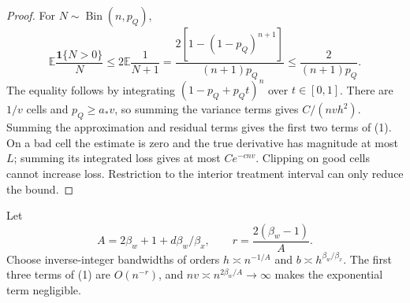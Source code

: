 \documentclass[11pt]{article}
\theoremstyle{remark}\newtheorem{remark}[theorem]{Remark}
\newcommand{\E}{\mathbb E}
\newcommand{\Ind}{\mathbf 1}
\begin{document}
\begin{proof}
For $N\sim\operatorname{Bin}(n,p_Q)$,
\[
 \E\frac{\Ind\{N>0\}}N
 \leq2\E\frac1{N+1}
 =\frac{2[1-(1-p_Q)^{n+1}]}{(n+1)p_Q}
 \leq\frac2{(n+1)p_Q}.
\]
The equality follows by integrating $(1-p_Q+p_Qt)^n$ over $t\in[0,1]$. There are $1/v$ cells and $p_Q\geq a_*v$, so summing the variance terms gives $C/(nv h^2)$. Summing the approximation and residual terms gives the first two terms of (1). On a bad cell the estimate is zero and the true derivative has magnitude at most $L$; summing its integrated loss gives at most $Ce^{-cnv}$. Clipping on good cells cannot increase loss. Restriction to the interior treatment interval can only reduce the bound.
\end{proof}

Let
\[
 A=2\beta_w+1+d\beta_w/\beta_x,\qquad
 r=\frac{2(\beta_w-1)}{A}.
\]
Choose inverse-integer bandwidths of orders
$h\asymp n^{-1/A}$ and $b\asymp h^{\beta_w/\beta_x}$.
The first three terms of (1) are $O(n^{-r})$, and
$nv\asymp n^{2\beta_w/A}\to\infty$ makes the exponential term negligible.
\end{document}
